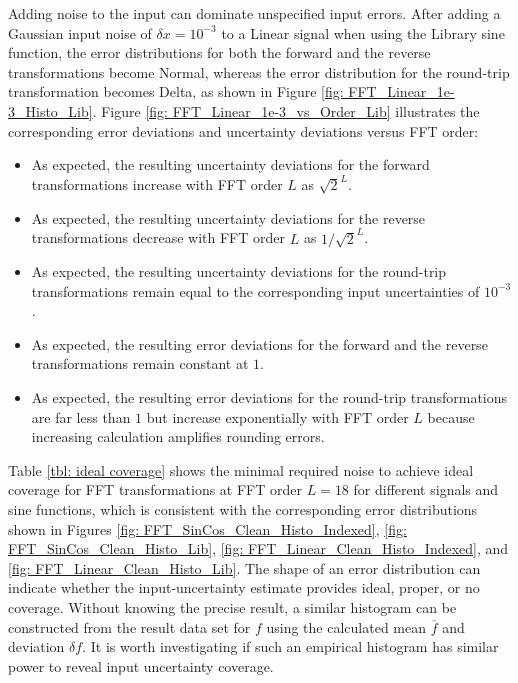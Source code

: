\documentclass[twoside]{article}
\numberwithin{equation}{section}
\begin{document}
Adding noise to the input can dominate unspecified input errors.
After adding a Gaussian input noise of $\delta x = 10^{-3}$ to a Linear signal when using the Library sine function, the error distributions for both the forward and the reverse transformations become Normal, whereas the error distribution for the round-trip transformation becomes Delta, as shown in Figure \ref{fig: FFT_Linear_1e-3_Histo_Lib}.
Figure \ref{fig: FFT_Linear_1e-3_vs_Order_Lib} illustrates the corresponding error deviations and uncertainty deviations versus FFT order:
\begin{itemize}
\item As expected, the resulting uncertainty deviations for the forward transformations increase with FFT order $L$ as $\sqrt{2}^L$.

\item As expected, the resulting uncertainty deviations for the reverse transformations decrease with FFT order $L$ as $1/\sqrt{2}^L$.

\item As expected, the resulting uncertainty deviations for the round-trip transformations remain equal to the corresponding input uncertainties of $10^{-3}$.

\item As expected, the resulting error deviations for the forward and the reverse transformations remain constant at $1$.

\item As expected, the resulting error deviations for the round-trip transformations are far less than $1$ but increase exponentially with FFT order $L$ because increasing calculation amplifies rounding errors.
\end{itemize}

Table \ref{tbl: ideal coverage} shows the minimal required noise to achieve ideal coverage for FFT transformations at FFT order $L=18$ for different signals and sine functions, which is consistent with the corresponding error distributions shown in Figures \ref{fig: FFT_SinCos_Clean_Histo_Indexed}, \ref{fig: FFT_SinCos_Clean_Histo_Lib}, \ref{fig: FFT_Linear_Clean_Histo_Indexed}, and \ref{fig: FFT_Linear_Clean_Histo_Lib}.
The shape of an error distribution can indicate whether the input-uncertainty estimate provides ideal, proper, or no coverage.
Without knowing the precise result, a similar histogram can be constructed from the result data set for $f$ using the calculated mean $\overline{f}$ and deviation $\delta f$.
It is worth investigating if such an empirical histogram has similar power to reveal input uncertainty coverage.
\end{document}
